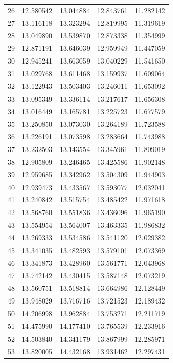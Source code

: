\begin{table}
\begin{tabular}{rrrrr}
26 & 12.580542 & 13.044884 & 12.843761 & 11.282142 \\
27 & 13.116118 & 13.323294 & 12.819995 & 11.319619 \\
28 & 13.049890 & 13.539870 & 12.873338 & 11.354999 \\
29 & 12.871191 & 13.646039 & 12.959949 & 11.447059 \\
30 & 12.945241 & 13.663059 & 13.040229 & 11.541650 \\
31 & 13.029768 & 13.611468 & 13.159937 & 11.609064 \\
32 & 13.122943 & 13.503403 & 13.246011 & 11.653092 \\
33 & 13.095349 & 13.336114 & 13.217617 & 11.656308 \\
34 & 13.016449 & 13.165781 & 13.225723 & 11.677579 \\
35 & 13.250850 & 13.073030 & 13.264189 & 11.723588 \\
36 & 13.226191 & 13.073598 & 13.283664 & 11.743988 \\
37 & 13.232503 & 13.143554 & 13.345961 & 11.809019 \\
38 & 12.905809 & 13.246465 & 13.425586 & 11.902148 \\
39 & 12.959685 & 13.342962 & 13.504309 & 11.944903 \\
40 & 12.939473 & 13.433567 & 13.593077 & 12.032041 \\
41 & 13.240842 & 13.515754 & 13.485422 & 11.971618 \\
42 & 13.568760 & 13.551836 & 13.436096 & 11.965190 \\
43 & 13.554954 & 13.564007 & 13.463335 & 11.986832 \\
44 & 13.269333 & 13.534586 & 13.541120 & 12.029382 \\
45 & 13.341035 & 13.482593 & 13.579101 & 12.073369 \\
46 & 13.341873 & 13.428960 & 13.561771 & 12.043968 \\
47 & 13.742142 & 13.430415 & 13.587148 & 12.073219 \\
48 & 13.560751 & 13.518814 & 13.664986 & 12.128449 \\
49 & 13.948029 & 13.716716 & 13.721523 & 12.189432 \\
50 & 14.206998 & 13.962884 & 13.753271 & 12.211719 \\
51 & 14.475990 & 14.177410 & 13.765539 & 12.233916 \\
52 & 14.503840 & 14.341179 & 13.867999 & 12.285971 \\
53 & 13.820005 & 14.432168 & 13.931462 & 12.297431 \\

\end{tabular}
\end{table}
